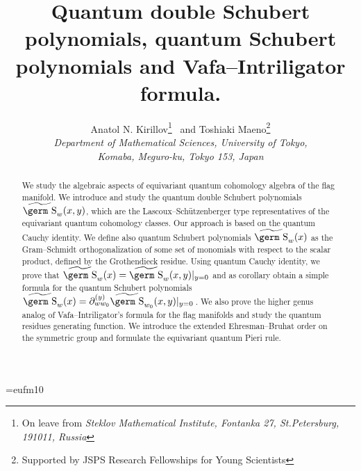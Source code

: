 %
%
%
\def \qed{\hfill $\vrule height 2.5mm  width 2.5mm depth 0mm $}
\newtheorem{lem}{Lemma}
\newtheorem{th}{Theorem}
\newtheorem{pr}{Proposition}
\newtheorem{col}{Corollary}
\newtheorem{de}{Definition}
\newtheorem{con}{Conjecture}
\newtheorem{cla}{Claim}
\def\al{\alpha}
\def\Res{\hbox{\rm Res}}
\def\mod{\hbox{\rm mod~}}
\def\Fl{\hbox{$Fl_n$}}
\def\ds{\displaystyle}
\def\wh{\widehat}
\def\wt{\widetilde}
\def\ld{\lambda}
\def\covec{\buildrel\leftarrow\over }
\font\germ=eufm10
\def\g{\hbox{\germ g}}
\def\s{\hbox{\germ S}}
\def\h{\hbox{\germ h}}
\def\d{\hbox{\germ D}}
\def\a{\hbox{\germ A}}
\def\t{\hbox{\germ T}}

\title{Quantum double Schubert polynomials, quantum Schubert polynomials
and Vafa--Intriligator formula.}
\vskip 0.4cm
\author{\Large {Anatol N. Kirillov}\thanks{On leave from {\it Steklov 
Mathematical Institute,
Fontanka 27, St.Petersburg, 191011, Russia}}~ \Large{and Toshiaki 
Maeno}\thanks{Supported by JSPS Research Fellowships for Young Scientists}
\medskip \\ 
{\small {\it Department of Mathematical Sciences, University of Tokyo,}}\\
{\small {\it Komaba, Meguro-ku, Tokyo 153, Japan}}}
\date{}
\maketitle 
\begin{abstract}
We study the algebraic aspects of equivariant quantum cohomology algebra 
of the flag manifold. We introduce and study the quantum double
Schubert polynomials $\wt{\s}_w(x,y)$, which are the 
Lascoux--Sch\"utzenberger type representatives of the equivariant
quantum cohomology classes. Our approach is based on the quantum Cauchy 
identity. We define also quantum Schubert polynomials $\wt{\s}_w(x)$ as
the Gram--Schmidt orthogonalization of some set of monomials with respect
to the scalar product, defined by the Grothendieck residue. Using quantum
Cauchy identity, we prove that $\wt{\s}_w(x)=\wt{\s}_w(x,y)|_{y=0}$ and
as corollary obtain a simple formula for the quantum Schubert polynomials
$\wt{\s}_w(x)=\partial_{ww_0}^{(y)}\wt{\s}_{w_0}(x,y)|_{y=0}$\,.
We also prove the higher genus analog of Vafa--Intriligator's formula for 
the flag manifolds and study the quantum residues generating function. 
We introduce the extended Ehresman--Bruhat order on the symmetric 
group and formulate the equivariant quantum Pieri rule.
\end{abstract}
\newpage

